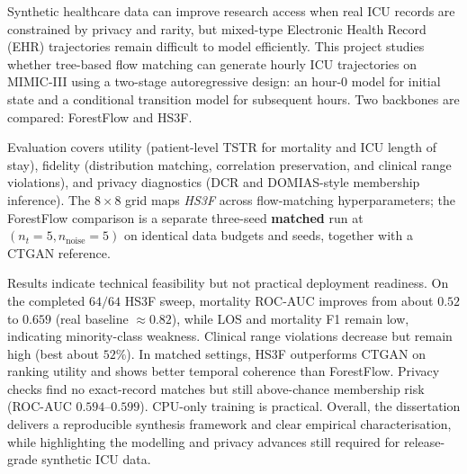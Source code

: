 Synthetic healthcare data can improve research access when real ICU records are constrained by privacy and rarity, but mixed-type Electronic Health Record (EHR) trajectories remain difficult to model efficiently. This project studies whether tree-based flow matching can generate hourly ICU trajectories on MIMIC-III using a two-stage autoregressive design: an hour-0 model for initial state and a conditional transition model for subsequent hours. Two backbones are compared: ForestFlow and HS3F.

Evaluation covers utility (patient-level TSTR for mortality and ICU length of stay), fidelity (distribution matching, correlation preservation, and clinical range violations), and privacy diagnostics (DCR and DOMIAS-style membership inference). The $8 \times 8$ grid maps \emph{HS3F} across flow-matching hyperparameters; the ForestFlow comparison is a separate three-seed \textbf{matched} run at $(n_t{=}5, n_{\text{noise}}{=}5)$ on identical data budgets and seeds, together with a CTGAN reference.

Results indicate technical feasibility but not practical deployment readiness. On the completed $64/64$ HS3F sweep, mortality ROC-AUC improves from about $0.52$ to $0.659$ (real baseline $\approx 0.82$), while LOS and mortality F1 remain low, indicating minority-class weakness. Clinical range violations decrease but remain high (best about $52\%$). In matched settings, HS3F outperforms CTGAN on ranking utility and shows better temporal coherence than ForestFlow. Privacy checks find no exact-record matches but still above-chance membership risk (ROC-AUC $0.594$--$0.599$). CPU-only training is practical. Overall, the dissertation delivers a reproducible synthesis framework and clear empirical characterisation, while highlighting the modelling and privacy advances still required for release-grade synthetic ICU data.
